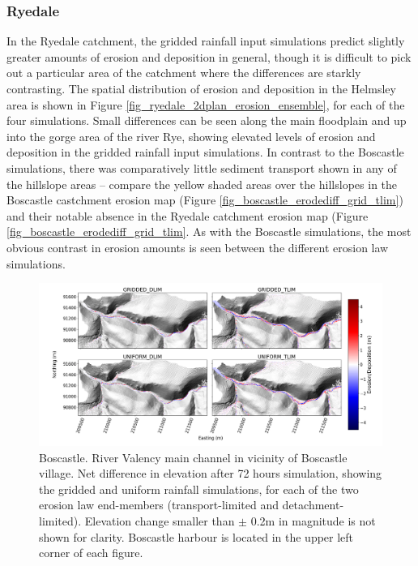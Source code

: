 \subsubsection{Ryedale}
In the Ryedale catchment, the gridded rainfall input simulations predict slightly greater amounts of erosion and deposition in general, though it is difficult to pick out a particular area of the catchment where the differences are starkly contrasting. The spatial distribution of erosion and deposition in the Helmsley area is shown in Figure \ref{fig_ryedale_2dplan_erosion_ensemble}, for each of the four simulations. Small differences can be seen along the main floodplain and up into the gorge area of the river Rye, showing elevated levels of erosion and deposition in the gridded rainfall input simulations. In contrast to the Boscastle simulations, there was comparatively little sediment transport shown in any of the hillslope areas -- compare the yellow shaded areas over the hillslopes in the Boscastle castchment erosion map (Figure \ref{fig_boscastle_erodediff_grid_tlim}) and their notable absence in the Ryedale catchment erosion map (Figure \ref{fig_boscastle_erodediff_grid_tlim}.
As with the Boscastle simulations, the most obvious contrast in erosion amounts is seen between the different erosion law simulations.



\begin{figure}
\includegraphics[width=25cm]{chp06_figures_scripts/figure_boscastle_erosion_diff_ensemble.png}
\caption{Boscastle. River Valency main channel in vicinity of Boscastle village. Net difference in elevation after 72 hours simulation, showing the gridded and uniform rainfall simulations, for each of the two erosion law end-members (transport-limited and detachment-limited). Elevation change smaller than \(\pm\) 0.2m in magnitude is not shown for clarity. Boscastle harbour is located in the upper left corner of each figure.}
\label{fig_boscastle_2dplan_erosion_ensemble}
\end{figure}


